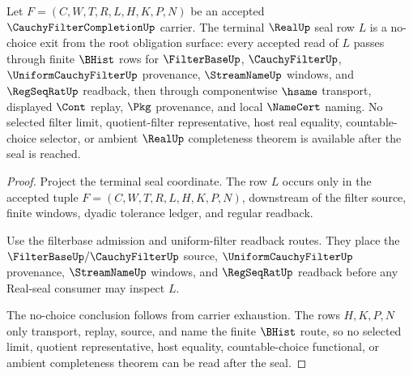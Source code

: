 \begin{theorem}
\label{thm:cauchy-filter-completion-root-real-seal-no-choice}
Let $F=(C,W,T,R,L,H,K,P,N)$ be an accepted $\CauchyFilterCompletionUp$ carrier. The terminal $\RealUp$ seal row $L$ is a no-choice exit from the root obligation surface: every accepted read of $L$ passes through finite $\BHist$ rows for $\FilterBaseUp$, $\CauchyFilterUp$, $\UniformCauchyFilterUp$ provenance, $\StreamNameUp$ windows, and $\RegSeqRatUp$ readback, then through componentwise $\hsame$ transport, displayed $\Cont$ replay, $\Pkg$ provenance, and local $\NameCert$ naming. No selected filter limit, quotient-filter representative, host real equality, countable-choice selector, or ambient $\RealUp$ completeness theorem is available after the seal is reached.
\end{theorem}
\begin{proof}
Project the terminal seal coordinate. The row $L$ occurs only in the accepted tuple $F=(C,W,T,R,L,H,K,P,N)$, downstream of the filter source, finite windows, dyadic tolerance ledger, and regular readback.

Use the filterbase admission and uniform-filter readback routes. They place the $\FilterBaseUp/\CauchyFilterUp$ source, $\UniformCauchyFilterUp$ provenance, $\StreamNameUp$ windows, and $\RegSeqRatUp$ readback before any Real-seal consumer may inspect $L$.

The no-choice conclusion follows from carrier exhaustion. The rows $H,K,P,N$ only transport, replay, source, and name the finite $\BHist$ route, so no selected limit, quotient representative, host equality, countable-choice functional, or ambient completeness theorem can be read after the seal.
\end{proof}

